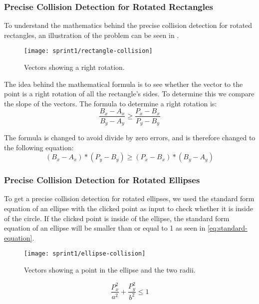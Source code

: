 \subsubsection{Precise Collision Detection for Rotated Rectangles}
To understand the mathematics behind the precise collision detection for rotated rectangles, an illustration of the problem can be seen in .

\begin{figure}[h]
	\centering
	\texttt{[image: sprint1/rectangle-collision]}
	\caption{Vectors showing a right rotation.}
	\label{figure:rectangle-collision}
\end{figure}

The idea behind the mathematical formula is to see whether the vector to the point is a right rotation of all the rectangle's sides.
To determine this we compare the slope of the vectors.
The formula to determine a right rotation is:
\begin{equation}
	\frac{B_x-A_x}{B_y-A_y} \geq \frac{P_x-B_x}{P_y-B_y}
\end{equation}

The formula is changed to avoid divide by zero errors, and is therefore changed to the following equation:
\begin{equation}
	(B_x-A_x)*(P_y-B_y) \geq (P_x-B_x)*(B_y-A_y)
\end{equation} 


\subsubsection{Precise Collision Detection for Rotated Ellipses}
To get a precise collision detection for rotated ellipses, we used the standard form equation of an ellipse with the clicked point as input to check whether it is inside of the circle.
If the clicked point is inside of the ellipse, the standard form equation of an ellipse will be smaller than or equal to 1 as seen in \eqref{eq:standard-equation}.

\begin{figure}[h]
	\centering
	\texttt{[image: sprint1/ellipse-collision]}
	\caption{Vectors showing a point in the ellipse and the two radii.}
	\label{figure:ellipse-collision}
\end{figure}

\begin{equation}\label{eq:standard-equation}
	\frac{P_x^2}{a^2} + \frac{P_y^2}{b^2} \leq 1
\end{equation}


